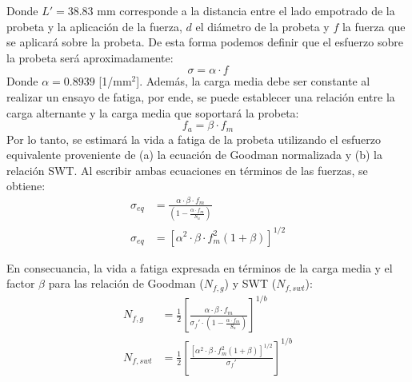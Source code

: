 Donde $L' = 38.83$ mm corresponde a la distancia entre el lado empotrado de la probeta y la aplicación de la fuerza, $d$ el diámetro de la probeta y $f$ la fuerza que se aplicará sobre la probeta. De esta forma podemos definir que el esfuerzo sobre la probeta será aproximadamente:
\begin{equation}
	\sigma = \alpha \cdot f
\end{equation}
Donde $\alpha = 0.8939$ [1/mm$^2$]. Además, la carga media debe ser constante al realizar un ensayo de fatiga, por ende, se puede establecer una relación entre la carga alternante y la carga media que soportará la probeta:
\begin{equation}
	f_a = \beta \cdot f_m
\end{equation}
Por lo tanto, se estimará la vida a fatiga de la probeta utilizando el esfuerzo equivalente proveniente de (a) la ecuación de Goodman normalizada y (b) la relación SWT. Al escribir ambas ecuaciones en términos de las fuerzas, se obtiene:
\begin{subequations}
\begin{align}
	\sigma_{eq} &= \frac{\alpha \cdot \beta \cdot f_m}{\left(1 - \frac{\alpha \cdot f_m}{S_u}\right)} \\
	\sigma_{eq} &= \left[ \alpha^2 \cdot \beta \cdot f_m^2 (1 + \beta)\right]^{1/2}
\end{align}
\end{subequations}

%
 
En consecuancia, la vida a fatiga expresada en términos de la carga media y el factor $\beta$ para las relación de Goodman ($N_{f,g}$) y SWT ($N_{f,swt}$):
\begin{subequations}
\begin{align}
	N_{f,g} &= \frac{1}{2} \left[\frac{\alpha \cdot \beta \cdot f_m}{\sigma_f' \cdot \left(1 - \frac{\alpha \cdot f_m}{S_u}\right)}\right]^{1/b} \\
	N_{f,swt} &= \frac{1}{2}\left[\frac{\left[ \alpha^2 \cdot \beta \cdot f_m^2 (1 + \beta)\right]^{1/2}}{\sigma_f'}\right]^{1/b}
\end{align}
\end{subequations}

